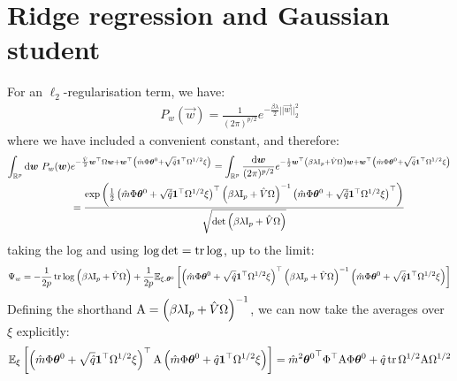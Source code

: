 \documentclass[11pt]{article}
\numberwithin{equation}{section}
\begin{document}
\section{Ridge regression and Gaussian student}
For an $\ell_{2}$-regularisation term, we have:
\begin{align}
P_{w}(\vec{w}) = \frac{1}{(2\pi)^{p/2}}e^{-\frac{\beta \lambda}{2}||\vec{w}||_{2}^2}	
\end{align}
\noindent where we have included a convenient constant, and therefore:
\begin{align}
\int_{\mathbb{R}^{p}}\text{d}\bm{w}~P_{w}(\bm{w})&e^{-\frac{\hat{V}}{2}\bm{w}^{\top}\Omega\bm{w}+\bm{w}^{\top}\left(\hat{m}\Phi\bm{\theta}^{0}+\sqrt{\hat{q}}\bm{1}^{\top}\Omega^{1/2}\xi\right)} =\int_{\mathbb{R}^{p}}\frac{\text{d}\bm{w}}{(2\pi)^{p/2}}e^{-\frac{1}{2}\bm{w}^{\top}\left(\beta\lambda\text{I}_{p}+\hat{V}\Omega\right)\bm{w}+\bm{w}^{\top}\left(\hat{m}\Phi\bm{\theta}^{0}+\sqrt{\hat{q}}\bm{1}^{\top}\Omega^{1/2}\xi\right)}\notag\\
&=\frac{\exp\left(\frac{1}{2}\left(\hat{m}\Phi\bm{\theta}^{0}+\sqrt{\hat{q}}\bm{1}^{\top}\Omega^{1/2}\xi\right)^{\top}\left(\beta\lambda\text{I}_{p}+\hat{V}\Omega\right)^{-1}\left(\hat{m}\Phi\bm{\theta}^{0}+\sqrt{\hat{q}}\bm{1}^{\top}\Omega^{1/2}\xi\right)^{\top}\right)}{\sqrt{\det\left(\beta\lambda\text{I}_{p}+\hat{V}\Omega\right)}}
\end{align}
\noindent taking the log and using $\log\det = \tr\log$, up to the limit:
\begin{align}
\Psi_{w} = -\frac{1}{2p}	\tr\log \left(\beta\lambda\text{I}_{p}+\hat{V}\Omega\right)+\frac{1}{2p}\mathbb{E}_{\xi,\bm{\theta}^{0}}\left[\left(\hat{m}\Phi\bm{\theta}^{0}+\sqrt{\hat{q}}\bm{1}^{\top}\Omega^{1/2}\xi\right)^{\top}\left(\beta\lambda\text{I}_{p}+\hat{V}\Omega\right)^{-1}\left(\hat{m}\Phi\bm{\theta}^{0}+\sqrt{\hat{q}}\bm{1}^{\top}\Omega^{1/2}\xi\right)\right]
\end{align}
Defining the shorthand $\text{A} = \left(\beta\lambda\text{I}_{p}+\hat{V}\Omega\right)^{-1}$, we can now take the averages over $\xi$ explicitly:
\begin{align}
	\mathbb{E}_{\xi}\left[\left(\hat{m}\Phi\bm{\theta}^{0}+\sqrt{\hat{q}}\bm{1}^{\top}\Omega^{1/2}\xi\right)^{\top}\text{A}\left(\hat{m}\Phi\bm{\theta}^{0}+\hat{q}\bm{1}^{\top}\Omega^{1/2}\xi\right)\right] = \hat{m}^{2}{\bm{\theta}^{0}}^{\top}\Phi^{\top}\text{A}\Phi\bm{\theta}^{0}+\hat{q}\tr\Omega^{1/2}\text{A} \Omega^{1/2}
\end{align}
\end{document}
